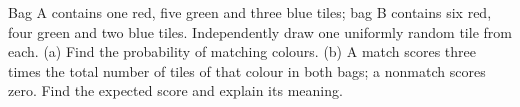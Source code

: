 Bag A contains one red, five green and three blue tiles; bag B contains six red, four green and two blue tiles. Independently draw one uniformly random tile from each. (a) Find the probability of matching colours. (b) A match scores three times the total number of tiles of that colour in both bags; a nonmatch scores zero. Find the expected score and explain its meaning.
